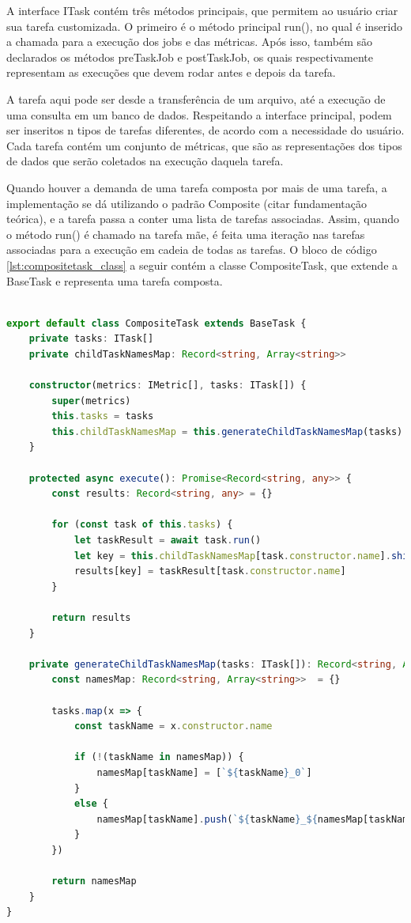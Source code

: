 \documentclass[12pt]{tcc}
\begin{document}
A interface ITask contém três métodos principais, que permitem ao usuário criar sua tarefa customizada. O primeiro é o método principal run(), no qual é inserido a chamada para a execução dos jobs e das métricas. Após isso, também são declarados os métodos preTaskJob e postTaskJob, os quais respectivamente representam as execuções que devem rodar antes e depois da tarefa.

A tarefa aqui pode ser desde a transferência de um arquivo, até a execução de uma consulta em um banco de dados. Respeitando a interface principal, podem ser inseritos n tipos de tarefas diferentes, de acordo com a necessidade do usuário. Cada tarefa contém um conjunto de métricas, que são as representações dos tipos de dados que serão coletados na execução daquela tarefa.

Quando houver a demanda de uma tarefa composta por mais de uma tarefa, a implementação se dá utilizando o padrão Composite (citar fundamentação teórica), e a tarefa passa a conter uma lista de tarefas associadas. Assim, quando o método run() é chamado na tarefa mãe, é feita uma iteração nas tarefas associadas para a execução em cadeia de todas as tarefas. O bloco de código \ref{lst:compositetask_class} a seguir contém a classe CompositeTask, que extende a BaseTask e representa uma tarefa composta.

\begin{lstlisting}[label={lst:compositetask_class}, caption={Implementação da classe responsável por representar uma tarefa composta.}, language=TypeScript, breaklines=true]

export default class CompositeTask extends BaseTask {
	private tasks: ITask[]
	private childTaskNamesMap: Record<string, Array<string>>

	constructor(metrics: IMetric[], tasks: ITask[]) {
		super(metrics)
		this.tasks = tasks
		this.childTaskNamesMap = this.generateChildTaskNamesMap(tasks)
	}

	protected async execute(): Promise<Record<string, any>> {
		const results: Record<string, any> = {}

		for (const task of this.tasks) {
			let taskResult = await task.run()
			let key = this.childTaskNamesMap[task.constructor.name].shift() || task.constructor.name
			results[key] = taskResult[task.constructor.name]
		}

		return results
	}

	private generateChildTaskNamesMap(tasks: ITask[]): Record<string, Array<string>> {
		const namesMap: Record<string, Array<string>>  = {}

		tasks.map(x => {
			const taskName = x.constructor.name

			if (!(taskName in namesMap)) {
				namesMap[taskName] = [`${taskName}_0`]
			}
			else {
				namesMap[taskName].push(`${taskName}_${namesMap[taskName].length}`)
			}
		})
		
		return namesMap
	}
}

\end{lstlisting}
\end{document}
